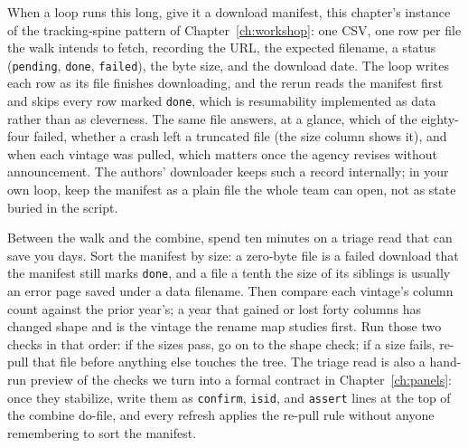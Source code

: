 When a loop runs this long, give it a download manifest, this chapter's instance of the tracking-spine pattern of Chapter~\ref{ch:workshop}: one CSV, one row per file the walk intends to fetch, recording the URL, the expected filename, a status (\texttt{pending}, \texttt{done}, \texttt{failed}), the byte size, and the download date. The loop writes each row as its file finishes downloading, and the rerun reads the manifest first and skips every row marked \texttt{done}, which is resumability implemented as data rather than as cleverness. The same file answers, at a glance, which of the eighty-four failed, whether a crash left a truncated file (the size column shows it), and when each vintage was pulled, which matters once the agency revises without announcement. The authors' downloader keeps such a record internally; in your own loop, keep the manifest as a plain file the whole team can open, not as state buried in the script.

Between the walk and the combine, spend ten minutes on a triage read that can save you days. Sort the manifest by size: a zero-byte file is a failed download that the manifest still marks \texttt{done}, and a file a tenth the size of its siblings is usually an error page saved under a data filename. Then compare each vintage's column count against the prior year's; a year that gained or lost forty columns has changed shape and is the vintage the rename map studies first. Run those two checks in that order: if the sizes pass, go on to the shape check; if a size fails, re-pull that file before anything else touches the tree. The triage read is also a hand-run preview of the checks we turn into a formal contract in Chapter~\ref{ch:panels}: once they stabilize, write them as \texttt{confirm}, \texttt{isid}, and \texttt{assert} lines at the top of the combine do-file, and every refresh applies the re-pull rule without anyone remembering to sort the manifest.

